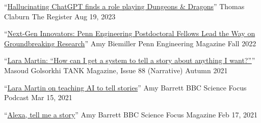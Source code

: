 \newpage
{\color{black}\fontsize{12pt}{1em}} 







  \cvmedia
    {``\href{https://www.theregister.com/2023/08/19/chatgpt_dnd_dm/}{Hallucinating ChatGPT finds a role playing Dungeons \& Dragons}''} %
    {Thomas Claburn} %
    {The Register} %
    {Aug 19, 2023} %

  \cvmedia
    {``\href{https://magazine.seas.upenn.edu/fall-2022/next-gen-innovators/}{Next-Gen Innovators: Penn Engineering Postdoctoral Fellows Lead the Way on Groundbreaking Research}''} %
    {Amy Biemiller} %
    {Penn Engineering Magazine} %
    {Fall 2022} %

  \cvmedia
    {``\href{https://magazine.tank.tv/issue-88/talk/lara-martin}{Lara Martin: ``How can I get a system to tell a story about anything I want?''}''} %
    {Masoud Golsorkhi} %
    {TANK Magazine, Issue 88 (Narrative)} %
    {Autumn 2021} %

  \cvmedia
    {``\href{https://www.sciencefocus.com/future-technology/lara-martin-on-teaching-ai-to-tell-stories/}{Lara Martin on teaching AI to tell stories}''} %
    {Amy Barrett} %
    {BBC Science Focus Podcast} %
    {Mar 15, 2021} %

  \cvmedia
    {``\href{https://www.sciencefocus.com/magazine/dark-stars/}{Alexa, tell me a story}''} %
    {Amy Barrett} %
    {BBC Science Focus Magazine} %
    {Feb 17, 2021} %

